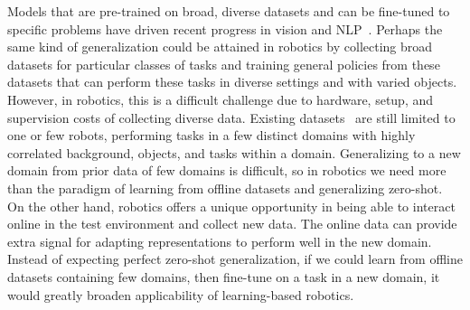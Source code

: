 \documentclass{article}
\begin{document}
Models that are pre-trained on broad, diverse datasets and can be fine-tuned to specific problems have driven recent progress in vision and NLP~\cite{krizhevsky2012imagenet, devlin2019bert}.
Perhaps the same kind of generalization could be attained in robotics by collecting broad datasets for particular classes of tasks and training general policies from these datasets that can perform these tasks in diverse settings and with varied objects.
However, in robotics, this is a difficult challenge due to hardware, setup, and supervision costs of collecting diverse data.
Existing datasets~\cite{ebert2021bridge, dasari2019robonet} are still limited to one or few robots, performing tasks in a few distinct domains with highly correlated background, objects, and tasks within a domain.
Generalizing to a new domain from prior data of few domains is difficult, so in robotics we need more than the paradigm of learning from offline datasets and generalizing zero-shot.
On the other hand, robotics offers a unique opportunity in being able to interact online in the test environment and collect new data.
The online data can provide extra signal for adapting representations to perform well in the new domain.
Instead of expecting perfect zero-shot generalization, if we could learn from offline datasets containing few domains, then fine-tune on a task in a new domain, it would greatly broaden applicability of learning-based robotics.
\end{document}
